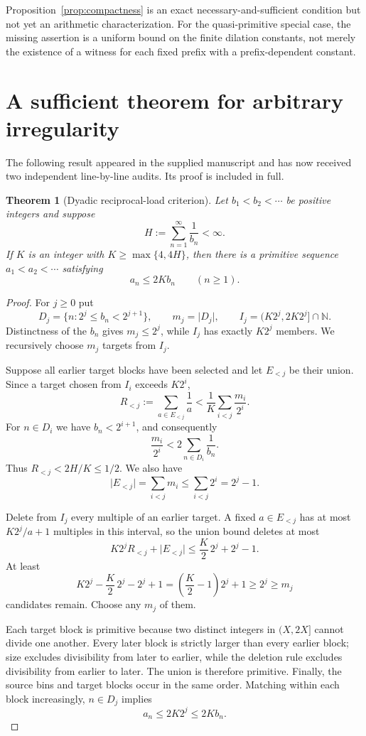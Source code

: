 \documentclass[11pt]{article}
\newtheorem{theorem}{Theorem}[section]
\theoremstyle{definition}
\theoremstyle{remark}
\newcommand{\N}{\mathbb N}
\newcommand{\card}[1]{\lvert #1\rvert}
\begin{document}
Proposition~\ref{prop:compactness} is an exact necessary-and-sufficient condition but
not yet an arithmetic characterization.  For the quasi-primitive special case, the
missing assertion is a uniform bound on the finite dilation constants, not merely the
existence of a witness for each fixed prefix with a prefix-dependent constant.

\section{A sufficient theorem for arbitrary irregularity}

The following result appeared in the supplied manuscript and has now received two
independent line-by-line audits.  Its proof is included in full.

\begin{theorem}[Dyadic reciprocal-load criterion]\label{thm:reciprocal-load}
Let $b_1<b_2<\cdots$ be positive integers and suppose
\[
  H:=\sum_{n=1}^{\infty}\frac1{b_n}<\infty.
\]
If $K$ is an integer with $K\ge\max\{4,4H\}$, then there is a primitive sequence
$a_1<a_2<\cdots$ satisfying
\[
  a_n\le 2K b_n\qquad(n\ge1).
\]
\end{theorem}

\begin{proof}
For $j\ge0$ put
\[
 D_j=\{n:2^j\le b_n<2^{j+1}\},\qquad m_j=\card{D_j},
 \qquad I_j=(K2^j,2K2^j]\cap\N.
\]
Distinctness of the $b_n$ gives $m_j\le2^j$, while $I_j$ has exactly $K2^j$
members.  We recursively choose $m_j$ targets from $I_j$.

Suppose all earlier target blocks have been selected and let $E_{<j}$ be their
union.  Since a target chosen from $I_i$ exceeds $K2^i$,
\[
 R_{<j}:=\sum_{a\in E_{<j}}\frac1a
 <\frac1K\sum_{i<j}\frac{m_i}{2^i}.
\]
For $n\in D_i$ we have $b_n<2^{i+1}$, and consequently
\[
 \frac{m_i}{2^i}<2\sum_{n\in D_i}\frac1{b_n}.
\]
Thus $R_{<j}<2H/K\le1/2$.  We also have
\[
 \card{E_{<j}}=\sum_{i<j}m_i\le\sum_{i<j}2^i=2^j-1.
\]

Delete from $I_j$ every multiple of an earlier target.  A fixed $a\in E_{<j}$
has at most $K2^j/a+1$ multiples in this interval, so the union bound deletes at
most
\[
 K2^jR_{<j}+\card{E_{<j}}
 \le \frac K2\,2^j+2^j-1.
\]
At least
\[
 K2^j-\frac K2\,2^j-2^j+1
 =\left(\frac K2-1\right)2^j+1
 \ge2^j\ge m_j
\]
candidates remain.  Choose any $m_j$ of them.

Each target block is primitive because two distinct integers in $(X,2X]$ cannot
divide one another.  Every later block is strictly larger than every earlier block;
size excludes divisibility from later to earlier, while the deletion rule excludes
divisibility from earlier to later.  The union is therefore primitive.  Finally,
the source bins and target blocks occur in the same order.  Matching within each
block increasingly, $n\in D_j$ implies
\[
 a_n\le2K2^j\le2Kb_n.
\]
\end{proof}
\end{document}
